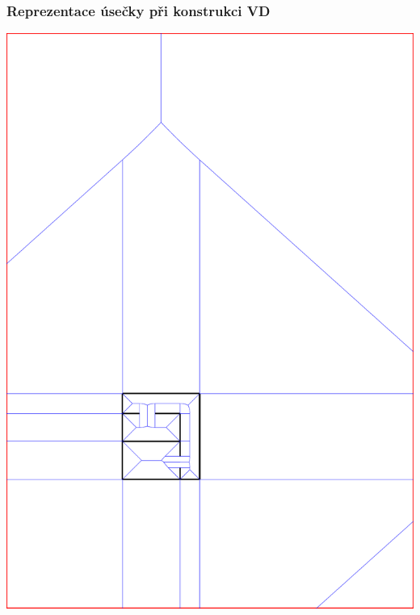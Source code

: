 \documentclass[notes=false,pdftex]{beamer}
\begin{document}
\begin{frame}[label=VDdetail]
	\frametitle{Reprezentace úsečky při konstrukci VD}
	\includegraphics[height=1\textheight,clip=true,trim=150pt 167pt 409pt 642pt]{images/line_segment-02-corner_detail.pdf} 
\end{frame}
\end{document}
